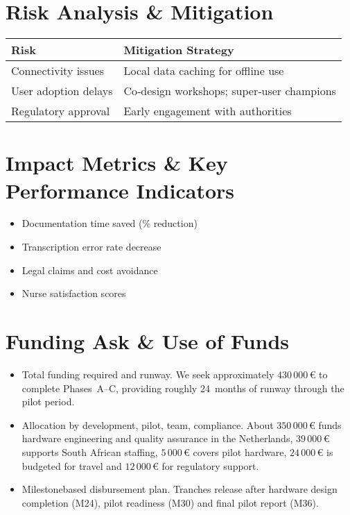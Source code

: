 \documentclass[a4paper,11pt]{article}
\begin{document}
\section{Risk Analysis \& Mitigation}
\begin{tabular}{p{} p{}}
\textbf{Risk} & \textbf{Mitigation Strategy} \\ \hline
Connectivity issues & Local data caching for offline use \\
User adoption delays & Co‐design workshops; super‐user champions \\
Regulatory approval & Early engagement with authorities \\
\end{tabular}

\section{Impact Metrics \& Key Performance Indicators}
\begin{itemize}
  \item Documentation time saved (\% reduction)
  \item Transcription error rate decrease
  \item Legal claims and cost avoidance
  \item Nurse satisfaction scores
\end{itemize}

\section{Funding Ask \& Use of Funds}
\begin{itemize}
  \item Total funding required and runway. We seek approximately \(430\,000\,\text{€}\) to complete Phases~A--C, providing roughly 24~months of runway through the pilot period.
  \item Allocation by development, pilot, team, compliance. About \(350\,000\,\text{€}\) funds hardware engineering and quality assurance in the Netherlands, \(39\,000\,\text{€}\) supports South African staffing, \(5\,000\,\text{€}\) covers pilot hardware, \(24\,000\,\text{€}\) is budgeted for travel and \(12\,000\,\text{€}\) for regulatory support.
  \item Milestone\-based disbursement plan. Tranches release after hardware design completion (M24), pilot readiness (M30) and final pilot report (M36).
\end{itemize}
\end{document}

